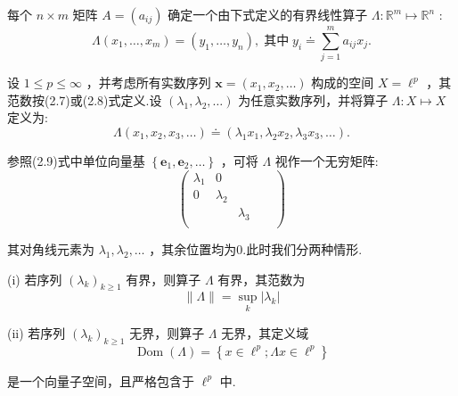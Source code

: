 \begin{instance}[矩阵作为线性算子]
    每个 $n \times  m$ 矩阵 $A = \left( {a}_{ij}\right)$ 确定一个由下式定义的有界线性算子 $\Lambda  : {\mathbb{R}}^{m} \mapsto  {\mathbb{R}}^{n}$ :
\[
\Lambda \left( {{x}_{1},\ldots ,{x}_{m}}\right)  = \left( {{y}_{1},\ldots ,{y}_{n}}\right) ,\;\text{其中}\;{y}_{i} \doteq  \mathop{\sum }\limits_{{j = 1}}^{m}{a}_{ij}{x}_{j}.
\]
\end{instance}
\begin{instance}[序列空间上的对角算子]
    设 $1 \leq  p \leq  \infty$ ，并考虑所有实数序列 $\bm{x} = \left( {{x}_{1},{x}_{2},\ldots }\right)$ 构成的空间 $X = {\ell }^{p}$ ，其范数按(2.7)或(2.8)式定义.设 $\left( {{\lambda }_{1},{\lambda }_{2},\ldots }\right)$ 为任意实数序列，并将算子 $\Lambda  : X \mapsto  X$ 定义为:
\begin{equation}\tag{2.13}
\Lambda \left( {{x}_{1},{x}_{2},{x}_{3},\ldots }\right)  \doteq  \left( {{\lambda }_{1}{x}_{1},{\lambda }_{2}{x}_{2},{\lambda }_{3}{x}_{3},\ldots }\right) .
\end{equation}

参照(2.9)式中单位向量基 $\left\{  {{\bm{e}}_{1},{\bm{e}}_{2},\ldots }\right\}$ ，可将 $\Lambda$ 视作一个无穷矩阵:
\[
\left( \begin{matrix} {\lambda }_{1} & 0 & & & \\  0 & {\lambda }_{2} & & & \\   & & {\lambda }_{3} & & \\   & & & &  \end{matrix}\right)
\]

其对角线元素为 ${\lambda }_{1},{\lambda }_{2},\ldots$ ，其余位置均为0.此时我们分两种情形.

(i) 若序列 ${\left( {\lambda }_{k}\right) }_{k \geq  1}$ 有界，则算子 $\Lambda$ 有界，其范数为
\begin{equation}\tag{2.14}
\| \Lambda \|  = \mathop{\sup }\limits_{k}\left| {\lambda }_{k}\right|
\end{equation}

(ii) 若序列 ${\left( {\lambda }_{k}\right) }_{k \geq  1}$ 无界，则算子 $\Lambda$ 无界，其定义域
\[
\operatorname{Dom}\left( \Lambda \right)  = \left\{  {x \in  {\ell }^{p};{\Lambda x} \in  {\ell }^{p}}\right\}
\]

是一个向量子空间，且严格包含于 ${\ell }^{p}$ 中.    
\end{instance}

